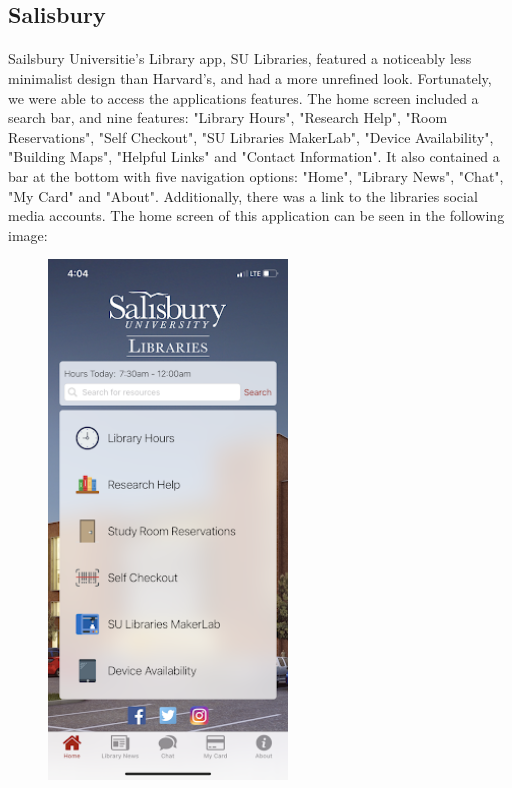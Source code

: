        \subsection{Salisbury}
            \paragraph{}
            Sailsbury Universitie's Library app, SU Libraries, featured a noticeably less minimalist design than Harvard's, and had a more unrefined look.  Fortunately, we were able to access the applications features. The home screen included a search bar, and nine features: "Library Hours", "Research Help", "Room Reservations", "Self Checkout", "SU Libraries MakerLab", "Device Availability", "Building Maps", "Helpful Links" and "Contact Information". It also contained a bar at the bottom with five navigation options: "Home", "Library News", "Chat", "My Card" and "About". Additionally, there was a link to the libraries social media accounts. The home screen of this application can be seen in the following image: 
            \begin{figure}[htbp]
            \centerline{\includegraphics[width=2.5in]{unnamed-3.png}}
            \end{figure}
